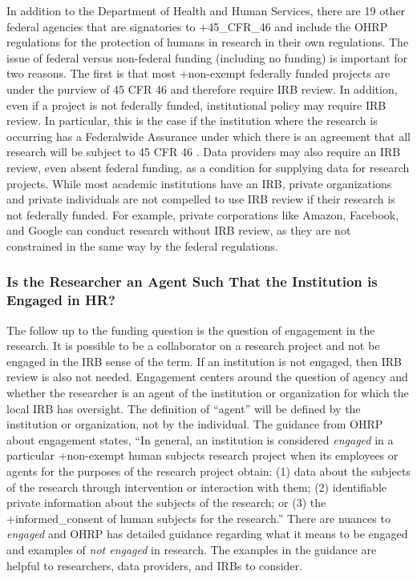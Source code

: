 \documentclass[
]{WileySix}
\begin{document}
In addition to the Department of Health and Human Services, there are 19 other federal agencies that are signatories to +45\_CFR\_46\textbar{} and include the OHRP regulations for the protection of humans in research in their own regulations. The issue of federal versus non-federal funding (including no funding) is important for two reasons. The first is that most +non-exempt\textbar{} federally funded projects are under the purview of 45 CFR 46 and therefore require IRB review. In addition, even if a project is not federally funded, institutional policy may require IRB review. In particular, this is the case if the institution where the research is occurring has a Federalwide Assurance under which there is an agreement that all research will be subject to 45 CFR 46 \citep{officeforhumanresearchprotections2017}. Data providers may also require an IRB review, even absent federal funding, as a condition for supplying data for research projects. While most academic institutions have an IRB, private organizations and private individuals are not compelled to use IRB review if their research is not federally funded. For example, private corporations like Amazon, Facebook, and Google can conduct research without IRB review, as they are not constrained in the same way by the federal regulations.

\hypertarget{is-the-researcher-an-agent-such-that-the-institution-is-engaged-in-hr}{%
\subsubsection{Is the Researcher an Agent Such That the Institution is Engaged in HR?}\label{is-the-researcher-an-agent-such-that-the-institution-is-engaged-in-hr}}

The follow up to the funding question is the question of engagement in the research. It is possible to be a collaborator on a research project and not be engaged in the IRB sense of the term. If an institution is not engaged, then IRB review is also not needed. Engagement centers around the question of agency and whether the researcher is an agent of the institution or organization for which the local IRB has oversight. The definition of ``agent'' will be defined by the institution or organization, not by the individual. The guidance from OHRP about engagement states, ``In general, an institution is considered \emph{engaged} in a particular +non-exempt\textbar{} human subjects research project when its employees or agents for the purposes of the research project obtain: (1) data about the subjects of the research through intervention or interaction with them; (2) identifiable private information about the subjects of the research; or (3) the +informed\_consent\textbar{} of human subjects for the research.'' \citep{codeoffederalregulations2017b} There are nuances to \emph{engaged} and OHRP has detailed guidance regarding what it means to be engaged and examples of \emph{not engaged} in research. The examples in the guidance are helpful to researchers, data providers, and IRBs to consider.
\end{document}
